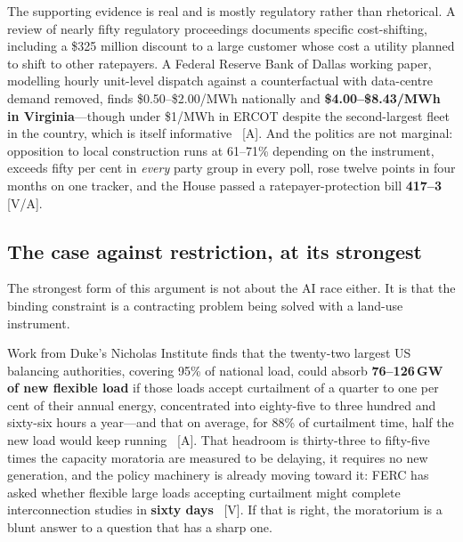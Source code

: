 The supporting evidence is real and is mostly regulatory rather than rhetorical. A review of nearly fifty regulatory proceedings documents specific cost-shifting, including a \$325 million discount to a large customer whose cost a utility planned to shift to other ratepayers. A Federal Reserve Bank of Dallas working paper, modelling hourly unit-level dispatch against a counterfactual with data-centre demand removed, finds \$0.50--\$2.00/MWh nationally and \textbf{\$4.00--\$8.43/MWh in Virginia}---though under \$1/MWh in ERCOT despite the second-largest fleet in the country, which is itself informative~\cite{moratorium-attribution} [A]. And the politics are not marginal: opposition to local construction runs at 61--71\% depending on the instrument, exceeds fifty per cent in \emph{every} party group in every poll, rose twelve points in four months on one tracker, and the House passed a ratepayer-protection bill \textbf{417--3}~\cite{moratorium-opinion} [V/A].

\subsection{The case against restriction, at its strongest}

The strongest form of this argument is not about the AI race either. It is that the binding constraint is a contracting problem being solved with a land-use instrument.

Work from Duke's Nicholas Institute finds that the twenty-two largest US balancing authorities, covering 95\% of national load, could absorb \textbf{76--126\,GW of new flexible load} if those loads accept curtailment of a quarter to one per cent of their annual energy, concentrated into eighty-five to three hundred and sixty-six hours a year---and that on average, for 88\% of curtailment time, half the new load would keep running~\cite{flexible-load-headroom} [A]. That headroom is thirty-three to fifty-five times the capacity moratoria are measured to be delaying, it requires no new generation, and the policy machinery is already moving toward it: FERC has asked whether flexible large loads accepting curtailment might complete interconnection studies in \textbf{sixty days}~\cite{federal-nopreempt} [V]. If that is right, the moratorium is a blunt answer to a question that has a sharp one.


